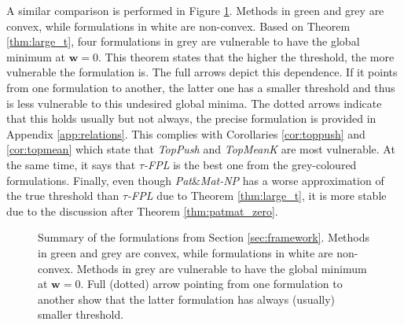 \documentclass{Thesis}
\newcommand{\TopPush}{\emph{TopPush}\xspace}
\newcommand{\TopPushK}{\emph{TopPushK}\xspace}
\newcommand{\tauFPL}{{\emph{$\tau$-FPL}}\xspace}
\newcommand{\TopMeanK}{\emph{TopMeanK}\xspace}
\newcommand{\PatMat}{\emph{Pat}\&\emph{Mat}\xspace}
\newcommand{\PatMatNP}{{\emph{Pat}\&\emph{Mat-NP}}\xspace}
\newcommand{\Grill}{\emph{Grill}\xspace}
\newcommand{\GrillNP}{\emph{Grill-NP}\xspace}
\begin{document}
A similar comparison is performed in Figure \ref{fig:thresholds}. Methods in green and grey are convex, while formulations in white are non-convex. Based on Theorem \ref{thm:large_t}, four formulations in grey are vulnerable to have the global minimum at $\bm{w}=0$. This theorem states that the higher the threshold, the more vulnerable the formulation is. The full arrows depict this dependence. If it points from one formulation to another, the latter one has a smaller threshold and thus is less vulnerable to this undesired global minima. The dotted arrows indicate that this holds usually but not always, the precise formulation is provided in Appendix \ref{app:relations}. This complies with Corollaries \ref{cor:toppush} and \ref{cor:topmean} which state that \TopPush and \TopMeanK are most vulnerable. At the same time, it says that \tauFPL is the best one from the grey-coloured formulations. %
Finally, even though \PatMatNP has a worse approximation of the true threshold than \tauFPL due to Theorem \ref{thm:large_t}, it is more stable due to the discussion after Theorem \ref{thm:patmat_zero}.


\begin{figure}[!ht]
  \centering
  \caption{Summary of the formulations from Section \ref{sec:framework}. Methods in green and grey are convex, while formulations in white are non-convex. Methods in grey are vulnerable to have the global minimum at $\bm{w}=0$. Full (dotted) arrow pointing from one formulation to another show that the latter formulation has always (usually) smaller threshold.}
  \label{fig:thresholds}
\end{figure}
\end{document}
